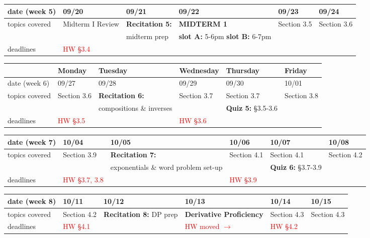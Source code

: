 \documentclass[11pt,fleqn]{article}
\begin{document}
\vfill
\begin{tabularx}{\textwidth}{|X|| X | X | X | X | X |}
\hline
\rowcolor{gray!20}
date (week 5)&09/20&09/21&09/22&09/23&09/24\\ \hline
topics covered&Midterm I Review&\textbf{Recitation 5:} &\textcolor{dcyan}{\textbf{MIDTERM 1}}&Section 3.5&Section 3.6\\
&&midterm prep&\textcolor{ddgreen}{\textbf{slot A:} 5-6pm  \textbf{slot B:} 6-7pm}&&\\ \hline
deadlines&\textcolor{red}{HW \S 3.4}&&&& \\  \hline \hline
\end{tabularx}
\vfill
\newpage

\begin{tabularx}{\textwidth}{|X|| X | X | X | X | X |}
\hline
&Monday & Tuesday & Wednesday & Thursday & Friday \\
\hline \hline
\rowcolor{gray!20}
date (week 6)&09/27&09/28&09/29&09/30&10/01\\ \hline
topics covered&Section 3.6&\textbf{Recitation 6:}&Section 3.7&Section 3.7&Section 3.8\\ 
&&compositions \& inverses&&\textbf{Quiz 5:} \S 3.5-3.6&\\ \hline
deadlines&\textcolor{red}{HW \S3.5}&&\textcolor{red}{HW \S 3.6}&& \\ \hline
\end{tabularx}
\vfill
\begin{tabularx}{\textwidth}{|X|| X | X | X | X | X |}
\hline
\rowcolor{gray!20}
date (week 7)&10/04&10/05&10/06&10/07&10/08\\ \hline
topics covered&Section 3.9&\textbf{Recitation 7:}&Section 4.1&Section 4.1&Section 4.2\\ 
&&exponentials \& word problem set-up&&\textbf{Quiz 6:} \S 3.7-3.9&\\ \hline
deadlines&\textcolor{red}{HW \S 3.7, 3.8}& &\textcolor{red}{HW \S 3.9}&& \\\hline 
\end{tabularx}
\vfill
\begin{tabularx}{\textwidth}{|X|| X | X | X | X | X |}
\hline
\rowcolor{gray!20}
date (week 8)&10/11&10/12&10/13&10/14&10/15\\ \hline
topics covered&Section 4.2&\textbf{Recitation 8:} DP prep&\textcolor{dcyan}{\textbf{Derivative Proficiency}}&Section 4.3&Section 4.3\\ 
 \hline
deadlines&\textcolor{red}{HW \S 4.1}&&\textcolor{red}{HW moved $\to$}&\textcolor{red}{HW \S 4.2}& \\ \hline 
\end{tabularx}
\end{document}
